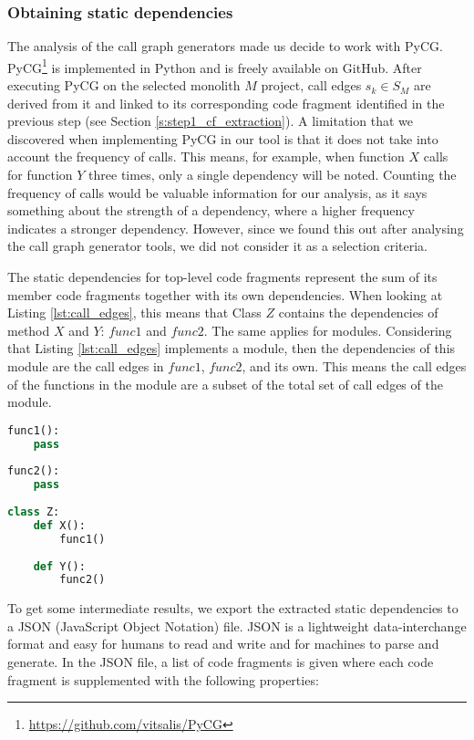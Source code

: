 \subsubsection{Obtaining static dependencies}
The analysis of the call graph generators made us decide to work with PyCG. PyCG\footnote{\href{https://github.com/vitsalis/PyCG}{https://github.com/vitsalis/PyCG}} is implemented in Python and is freely available on GitHub. After executing PyCG on the selected monolith $M$ project, call edges $s_k \in S_M$ are derived from it and linked to its corresponding code fragment identified in the previous step (see Section \ref{s:step1_cf_extraction}). A limitation that we discovered when implementing PyCG in our tool is that it does not take into account the frequency of calls. This means, for example, when function $X$ calls for function $Y$ three times, only a single dependency will be noted. Counting the frequency of calls would be valuable information for our analysis, as it says something about the strength of a dependency, where a higher frequency indicates a stronger dependency. However, since we found this out after analysing the call graph generator tools, we did not consider it as a selection criteria. \par
The static dependencies for top-level code fragments represent the sum of its member code fragments together with its own dependencies. When looking at Listing \ref{lst:call_edges}, this means that Class $Z$ contains the dependencies of method $X$ and $Y$: $func1$ and $func2$. The same applies for modules. Considering that Listing \ref{lst:call_edges} implements a module, then the dependencies of this module are the call edges in $func1$, $func2$, and its own. This means the call edges of the functions in the module are a subset of the total set of call edges of the module. \par

\begin{lstlisting}[language=Python, caption=A top-level code fragment contains the call edges of its members., label={lst:call_edges}]
func1():
    pass
    
func2():
    pass
    
class Z:
    def X():
        func1()
    
    def Y():
        func2()
\end{lstlisting}

To get some intermediate results, we export the extracted static dependencies to a JSON (JavaScript Object Notation) file. JSON is a lightweight data-interchange format and easy for humans to read and write and for machines to parse and generate. In the JSON file, a list of code fragments is given where each code fragment is supplemented with the following properties:

